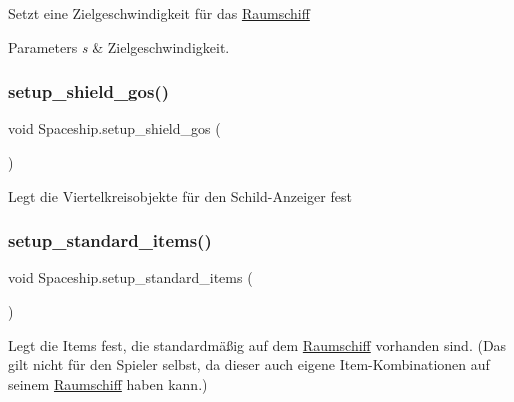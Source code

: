Setzt eine Zielgeschwindigkeit für das \hyperlink{class_raumschiff}{Raumschiff} 


\begin{DoxyParams}{Parameters}
{\em s} & Zielgeschwindigkeit.\\
\hline
\end{DoxyParams}
\mbox{\label{class_spaceship_a18e0ef162384544259aa3ec4f55ad5f8}} 
\subsubsection{\texorpdfstring{setup\+\_\+shield\+\_\+gos()}{setup\_shield\_gos()}}
{\footnotesize\ttfamily void Spaceship.\+setup\+\_\+shield\+\_\+gos (\begin{DoxyParamCaption}{ }\end{DoxyParamCaption})}



Legt die Viertelkreisobjekte für den Schild-\/\+Anzeiger fest 

\mbox{\label{class_spaceship_a65c885ff5b2c4b2142d02ed093d734a2}} 
\subsubsection{\texorpdfstring{setup\+\_\+standard\+\_\+items()}{setup\_standard\_items()}}
{\footnotesize\ttfamily void Spaceship.\+setup\+\_\+standard\+\_\+items (\begin{DoxyParamCaption}{ }\end{DoxyParamCaption})}



Legt die Items fest, die standardmäßig auf dem \hyperlink{class_raumschiff}{Raumschiff} vorhanden sind. (Das gilt nicht für den Spieler selbst, da dieser auch eigene Item-\/\+Kombinationen auf seinem \hyperlink{class_raumschiff}{Raumschiff} haben kann.) 

\mbox{\label{class_spaceship_a5c0e06422ea1860e18dce8171a585676}} 
